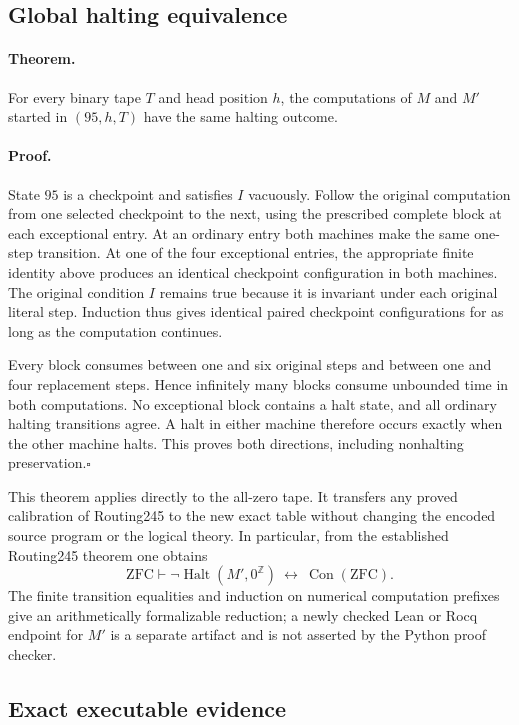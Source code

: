 \subsection{Global halting equivalence}

\paragraph{Theorem.}
For every binary tape $T$ and head position $h$, the computations of $M$
and $M'$ started in $(95,h,T)$ have the same halting outcome.

\paragraph{Proof.}
State $95$ is a checkpoint and satisfies $I$ vacuously.  Follow the
original computation from one selected checkpoint to the next, using
the prescribed complete block at each exceptional entry.  At an ordinary
entry both machines make the same one-step transition.  At one of the
four exceptional entries, the appropriate finite identity above produces
an identical checkpoint configuration in both machines.  The original
condition $I$ remains true because it is invariant under each original
literal step.  Induction thus gives identical paired checkpoint
configurations for as long as the computation continues.

Every block consumes between one and six original steps and between one
and four replacement steps.  Hence infinitely many blocks consume
unbounded time in both computations.  No exceptional block contains a
halt state, and all ordinary halting transitions agree.  A halt in either
machine therefore occurs exactly when the other machine halts.  This
proves both directions, including nonhalting preservation.\hfill$\square$

This theorem applies directly to the all-zero tape.  It transfers any
proved calibration of Routing245 to the new exact table without changing
the encoded source program or the logical theory.  In particular, from
the established Routing245 theorem one obtains
\[
 \mathrm{ZFC}\vdash
 \neg\operatorname{Halt}(M',0^{\mathbb Z})
 \ \longleftrightarrow\ \operatorname{Con}(\mathrm{ZFC}).
\]
The finite transition equalities and induction on numerical computation
prefixes give an arithmetically formalizable reduction; a newly checked
Lean or Rocq endpoint for $M'$ is a separate artifact and is not asserted
by the Python proof checker.

\subsection{Exact executable evidence}

